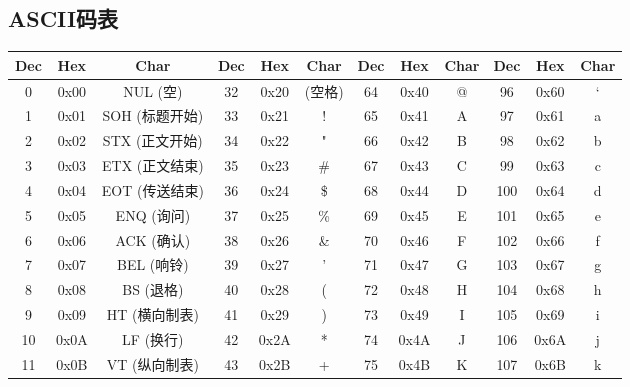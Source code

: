 \documentclass[a4paper, twoside]{article}
\begin{document}
\subsection{ASCII码表}
\begin{table}[h]
    \centering
    \renewcommand{\arraystretch}{1.4}
    \setlength{\tabcolsep}{5pt}
    \begin{tabular}{|c c c|c c c|c c c|c c c|}
        \hline
        \textbf{Dec} & \textbf{Hex} & \textbf{Char} & \textbf{Dec} & \textbf{Hex} & \textbf{Char} & \textbf{Dec} & \textbf{Hex} & \textbf{Char} & \textbf{Dec} & \textbf{Hex} & \textbf{Char} \\
        \hline
            0  & 0x00 & NUL (空)          & 32  & 0x20 & (空格)     & 64  & 0x40 & @           &  96  & 0x60 & `            \\
            1  & 0x01 & SOH (标题开始)    & 33  & 0x21 & !          & 65  & 0x41 & A           &  97  & 0x61 & a            \\
            2  & 0x02 & STX (正文开始)    & 34  & 0x22 & "          & 66  & 0x42 & B           &  98  & 0x62 & b            \\
            3  & 0x03 & ETX (正文结束)    & 35  & 0x23 & \#         & 67  & 0x43 & C           &  99  & 0x63 & c            \\
            4  & 0x04 & EOT (传送结束)    & 36  & 0x24 & \$         & 68  & 0x44 & D           & 100  & 0x64 & d            \\
            5  & 0x05 & ENQ (询问)        & 37  & 0x25 & \%         & 69  & 0x45 & E           & 101  & 0x65 & e            \\
            6  & 0x06 & ACK (确认)        & 38  & 0x26 & \&         & 70  & 0x46 & F           & 102  & 0x66 & f            \\
            7  & 0x07 & BEL (响铃)        & 39  & 0x27 & '          & 71  & 0x47 & G           & 103  & 0x67 & g            \\
            8  & 0x08 & BS (退格)         & 40  & 0x28 & (          & 72  & 0x48 & H           & 104  & 0x68 & h            \\
            9  & 0x09 & HT (横向制表)     & 41  & 0x29 & )          & 73  & 0x49 & I           & 105  & 0x69 & i            \\
        10  & 0x0A & LF (换行)         & 42  & 0x2A & *          & 74  & 0x4A & J           & 106  & 0x6A & j            \\
        11  & 0x0B & VT (纵向制表)     & 43  & 0x2B & +          & 75  & 0x4B & K           & 107  & 0x6B & k            \\

\end{tabular}
\end{table}
\end{document}
